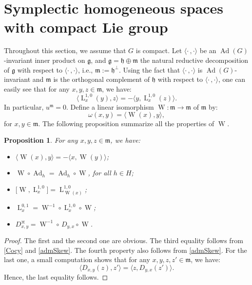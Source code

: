 \documentclass[preprint,12pt,1p]{elsarticle}
\theoremstyle{plain}
\newtheorem{proposition}[theorem]{Proposition}
\theoremstyle{definition}
\newcommand{\ro}{\circ}
\newcommand{\met}{\langle\cdot\,,\cdot\rangle}
\newcommand{\h}{\mathfrak{h}}
\newcommand{\Ad}{\operatorname{Ad}}
\newcommand{\la}{\operatorname{L}^{0,1}}
\newcommand{\lm}{\operatorname{L}^{1,0}}
\newcommand{\F}{\operatorname{W}}
\numberwithin{equation}{section}
\newcommand{\aj}{\divideontimes}
\begin{document}
\section{Symplectic homogeneous spaces with compact Lie group}\label{Section4}

Throughout this section, we assume that $G$ is compact. Let $\met$ be an $\Ad(G)$-invariant inner product on $\mathfrak{g}$, and $\mathfrak{g}=\mathfrak{h}\oplus\mathfrak{m}$ the natural reductive decomposition of $\mathfrak{g}$ with respect to $\met$, i.e., $\mathfrak{m}:=\mathfrak{h}^\perp$.
Using the fact that $\met$ is $\Ad(G)$-invariant and $\mathfrak{m}$ is the orthogonal complement of $\h$ with respect to $\met$, one can easily see that for any $x,y,z\in\mathfrak{m}$, we have:
\begin{equation}\label{admSkew}
\langle \lm_x(y),z\rangle =-\langle y,\lm_x(z)\rangle .
\end{equation}
In particular, $u^\mathfrak{m}=0$. Define a linear isomorphism $\F:\mathfrak{m}\to\mathfrak{m}$ of $\mathfrak{m}$ by:
\begin{equation}\label{W}
\omega(x,y)=\langle \F(x),y\rangle ,
\end{equation}
for $x,y\in\mathfrak{m}$. The following proposition summarize all the properties of $\F$.
\begin{proposition}\label{Cpt}
For any $x,y,z\in\mathfrak{m}$, we have:
\begin{itemize}
\item[$1.$] $\langle \F(x),y\rangle =-\langle  x,\F(y)\rangle $;
\item[$2.$] $\F\ro\Ad_h=\Ad_h\ro\F$, for all $h\in H$;
\item[$3.$] $\big[\F,\lm_x\big]=\lm_{\F(x)}$;
\item[$4.$] $\la_x=\F^{-1}\ro\lm_x\ro\F$;
\item[$5.$] $D^\aj_{x,y}=\F^{-1}\ro\,D_{y,x}\ro\F$.
\end{itemize}
\end{proposition}

\begin{proof}
The first and the second one are obvious. The third equality follows from \eqref{Cocy} and \eqref{admSkew}. The fourth property also follows from \eqref{admSkew}. For the last one, a small computation shows that for any $x,y,z,z'\in\mathfrak{m}$, we have:
\begin{equation*}
\langle D_{x,y}(z),z'\rangle =\langle z,D_{y,x}(z')\rangle .
\end{equation*}
Hence, the last equality follows.
\end{proof}
\end{document}
